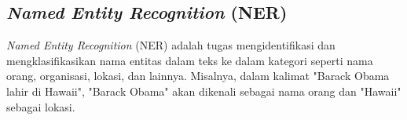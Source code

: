 \subsection{\textit{Named Entity Recognition} (NER)}

\textit{Named Entity Recognition} (NER) adalah tugas mengidentifikasi dan mengklasifikasikan nama entitas dalam teks ke dalam kategori seperti nama orang, organisasi, lokasi, dan lainnya. Misalnya, dalam kalimat "Barack Obama lahir di Hawaii", "Barack Obama" akan dikenali sebagai nama orang dan "Hawaii" sebagai lokasi.